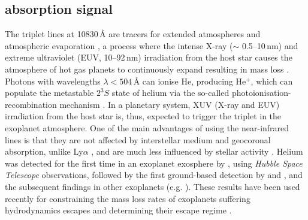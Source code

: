 \documentclass{aa}
\begin{document}
\subsection{ absorption signal} \label{sec:results_HeI}

The  triplet lines at 10830\,{\AA} are tracers for extended atmospheres and atmospheric evaporation \citep{SeagerSas2000}, a process where the intense X-ray ($\sim$ 0.5--10\,nm) and extreme ultraviolet (EUV, 10--92\,nm) irradiation from the host star causes the atmosphere of hot gas planets to continuously expand resulting in mass loss \citep{Salz2016}. Photons with wavelengths $\lambda < 504$\,{\AA} can ionise He, producing He$^+$, which can populate the metastable $2^3S$ state of helium via the so-called photoionisation-recombination mechanism \citep{SanzForcada2008}. In a planetary system, XUV (X-ray and EUV) irradiation from the host star is, thus, expected to trigger the  triplet in the exoplanet atmosphere. One of the main advantages of using the near-infrared  lines is that they are not affected by interstellar medium \citep{Indriolo2009} and geocoronal absorption, unlike Ly$\alpha$ \citep{Oklop2018}, and are much less influenced by stellar activity \citep{Cauley2018}. Helium was detected for the first time in an exoplanet exosphere by \citet{Spake2018}, using {\em Hubble Space Telescope} observations, followed by the first ground-based detection by \citet{Nortmann2018Science} and \citet{Allart2018}, and the subsequent findings in other exoplanets (e.g. \citealt{Salz2018He,Allart2019,AlonsoFloriano2019HD209,Palle2020a}). These results have been used recently for constraining the mass loss rates of exoplanets suffering hydrodynamics escapes and determining their escape regime \citep{Lampon2020, Lampon2021,Lampon2021a}.
\end{document}
